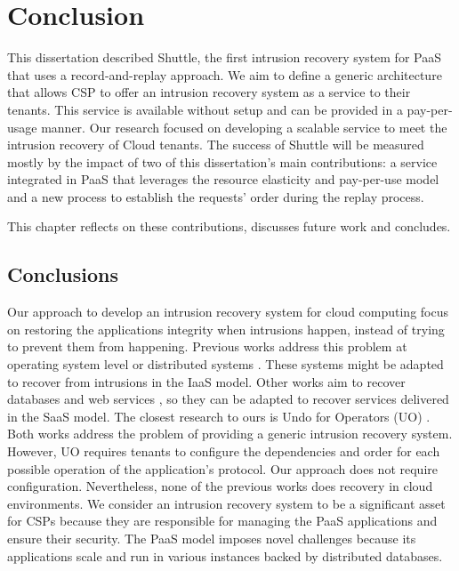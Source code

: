 \chapter{Conclusion}\label{chapter:conclusion}
This dissertation described Shuttle, the first intrusion recovery system for \acf{PaaS} that uses a record-and-replay approach. We aim to define a generic architecture that allows \acf{CSP} to offer an intrusion recovery system as a service to their tenants. This service is available without setup and can be provided in a pay-per-usage manner. Our research focused on developing a scalable service to meet the intrusion recovery of Cloud tenants. The success of Shuttle will be measured mostly by the impact of two of this dissertation's main contributions: a service integrated in \ac{PaaS} that leverages the resource elasticity and pay-per-use model and a new process to establish the requests' order during the replay process.

This chapter reflects on these contributions, discusses future work and concludes.

\section{Conclusions}\label{sec:conclusion:conclusion}
Our approach to develop an intrusion recovery system for cloud computing focus on restoring the applications integrity when intrusions happen, instead of trying to prevent them from happening. Previous works address this problem at operating system level \cite{taser,retro} or distributed systems \cite{aire}. These systems might be adapted to recover from intrusions in the \acf{IaaS} model. Other works aim to recover databases \cite{itdb,phoenix} and web services \cite{warp,goel,aire}, so they can be adapted to recover services delivered in the \acf{SaaS} model. The closest research to ours is Undo for Operators (UO) \cite{undoForOperators}. Both works address the problem of providing a generic intrusion recovery system. However, UO requires tenants to configure the dependencies and order for each possible operation of the application's protocol. Our approach does not require configuration. Nevertheless, none of the previous works does recovery in cloud environments. We consider an intrusion recovery system to be a significant asset for CSPs because they are responsible for managing the \ac{PaaS} applications and ensure their security. The \ac{PaaS} model imposes novel challenges because its applications scale and run in various instances backed by distributed databases. \\

